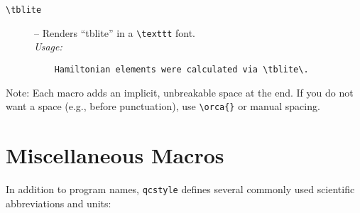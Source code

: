 \documentclass[a4paper,12pt]{article}
\begin{document}
\begin{description}
    \item[\texttt{\textbackslash tblite}] – Renders “tblite” in a \verb|\texttt| font.\\
    \textit{Usage:}
    \begin{verbatim}
    Hamiltonian elements were calculated via \tblite\.
    \end{verbatim}
\end{description}

\noindent Note: Each macro adds an implicit, unbreakable space at the end. If you do not want a space (e.g., before punctuation), use \verb|\orca{}| or manual spacing.

\section{Miscellaneous Macros}
\label{sec:misc}
In addition to program names, \texttt{qcstyle} defines several commonly used scientific abbreviations and units:
\end{document}
